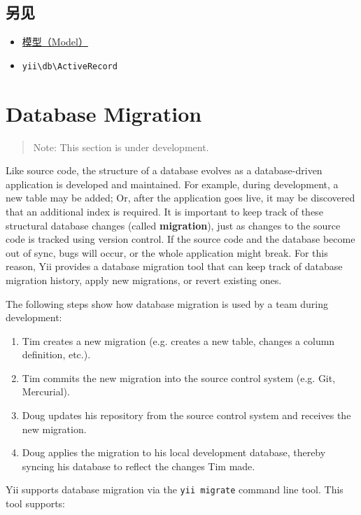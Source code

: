 \subsection{另见}
\begin{itemize}
\item \hyperref[model.md]{模型（Model）}
\item \texttt{yii{\allowbreak{}\textbackslash}db{\allowbreak{}\textbackslash}ActiveRecord}
\end{itemize}


\label{db-migrations.md}\section{Database Migration}
\begin{quote}Note: This section is under development.

\end{quote}
Like source code, the structure of a database evolves as a database-driven application is developed and maintained. For example, during development, a new table may be added; Or, after the application goes live, it may be discovered that an additional index is required. It is important to keep track of these structural database changes (called \textbf{migration}), just as changes to the source code is tracked using version control. If the source code and the database become out of sync, bugs will occur, or the whole application might break. For this reason, Yii provides a database migration
tool that can keep track of database migration history, apply new migrations, or revert existing ones.

The following steps show how database migration is used by a team during development:

\begin{enumerate}
\item Tim creates a new migration (e.g. creates a new table, changes a column definition, etc.).
\item Tim commits the new migration into the source control system (e.g. Git, Mercurial).
\item Doug updates his repository from the source control system and receives the new migration.
\item Doug applies the migration to his local development database, thereby syncing his database to reflect the changes Tim made.
\end{enumerate}
Yii supports database migration via the \lstinline|yii migrate| command line tool. This tool supports:

